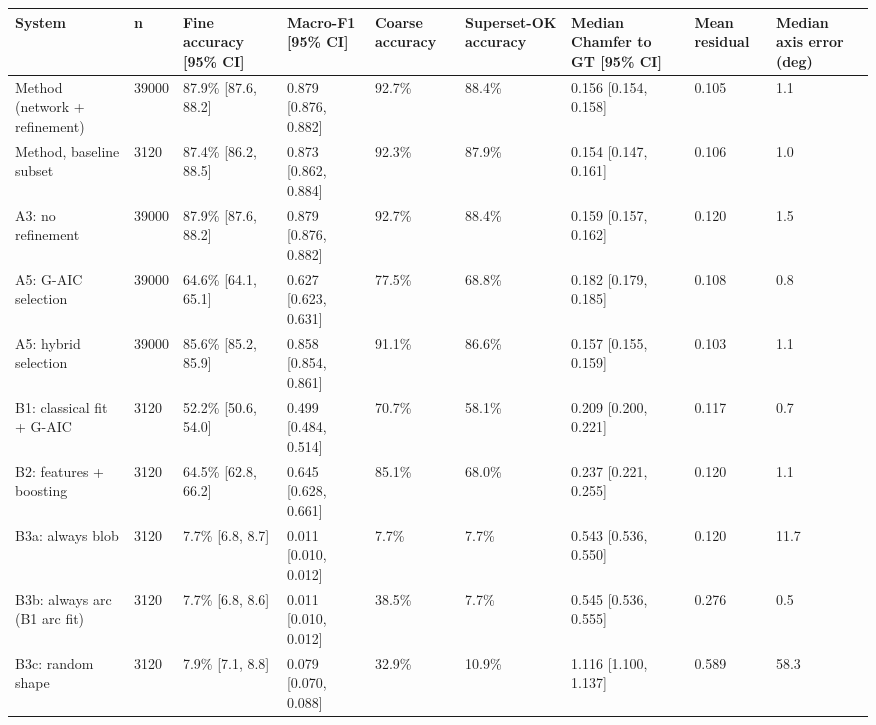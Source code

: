 \scriptsize
\begin{tabular}{lllllllll}
\toprule
\textbf{System} & \textbf{n} & \textbf{Fine accuracy [95\% CI]} & \textbf{Macro-F1 [95\% CI]} & \textbf{Coarse accuracy} & \textbf{Superset-OK accuracy} & \textbf{Median Chamfer to GT [95\% CI]} & \textbf{Mean residual} & \textbf{Median axis error (deg)} \\
\midrule
Method (network + refinement) & 39000 & 87.9\% [87.6, 88.2] & 0.879 [0.876, 0.882] & 92.7\% & 88.4\% & 0.156 [0.154, 0.158] & 0.105 & 1.1 \\
Method, baseline subset & 3120 & 87.4\% [86.2, 88.5] & 0.873 [0.862, 0.884] & 92.3\% & 87.9\% & 0.154 [0.147, 0.161] & 0.106 & 1.0 \\
A3: no refinement & 39000 & 87.9\% [87.6, 88.2] & 0.879 [0.876, 0.882] & 92.7\% & 88.4\% & 0.159 [0.157, 0.162] & 0.120 & 1.5 \\
A5: G-AIC selection & 39000 & 64.6\% [64.1, 65.1] & 0.627 [0.623, 0.631] & 77.5\% & 68.8\% & 0.182 [0.179, 0.185] & 0.108 & 0.8 \\
A5: hybrid selection & 39000 & 85.6\% [85.2, 85.9] & 0.858 [0.854, 0.861] & 91.1\% & 86.6\% & 0.157 [0.155, 0.159] & 0.103 & 1.1 \\
B1: classical fit + G-AIC & 3120 & 52.2\% [50.6, 54.0] & 0.499 [0.484, 0.514] & 70.7\% & 58.1\% & 0.209 [0.200, 0.221] & 0.117 & 0.7 \\
B2: features + boosting & 3120 & 64.5\% [62.8, 66.2] & 0.645 [0.628, 0.661] & 85.1\% & 68.0\% & 0.237 [0.221, 0.255] & 0.120 & 1.1 \\
B3a: always blob & 3120 & 7.7\% [6.8, 8.7] & 0.011 [0.010, 0.012] & 7.7\% & 7.7\% & 0.543 [0.536, 0.550] & 0.120 & 11.7 \\
B3b: always arc (B1 arc fit) & 3120 & 7.7\% [6.8, 8.6] & 0.011 [0.010, 0.012] & 38.5\% & 7.7\% & 0.545 [0.536, 0.555] & 0.276 & 0.5 \\
B3c: random shape & 3120 & 7.9\% [7.1, 8.8] & 0.079 [0.070, 0.088] & 32.9\% & 10.9\% & 1.116 [1.100, 1.137] & 0.589 & 58.3 \\
\bottomrule
\end{tabular}
